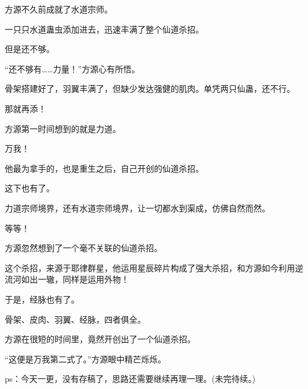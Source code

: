 \begin{this_body}
方源不久前成就了水道宗师。

一只只水道蛊虫添加进去，迅速丰满了整个仙道杀招。

但是还不够。

“还不够有……力量！”方源心有所悟。

骨架搭建好了，羽翼丰满了，但缺少发达强健的肌肉。单凭两只仙蛊，还不行。

那就再添！

方源第一时间想到的就是力道。

万我！

他最为拿手的，也是重生之后，自己开创的仙道杀招。

这下也有了。

力道宗师境界，还有水道宗师境界，让一切都水到渠成，仿佛自然而然。

等等！

方源忽然想到了一个毫不关联的仙道杀招。

这个杀招，来源于耶律群星，他运用星辰碎片构成了强大杀招，和方源如今利用逆流河如出一辙，同样是运用外物！

于是，经脉也有了。

骨架、皮肉、羽翼、经脉，四者俱全。

方源在很短的时间里，竟然开创出了一个仙道杀招。

“这便是万我第二式了。”方源眼中精芒烁烁。

ps：今天一更，没有存稿了，思路还需要继续再理一理。(未完待续。)

\end{this_body}

